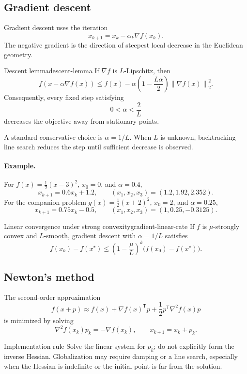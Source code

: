\documentclass[11pt]{article}
\newcommand{\trans}{^{\mathsf T}}
\newcommand{\grad}{\nabla}
\newcommand{\norm}[1]{\left\lVert#1\right\rVert}
\theoremstyle{definition}
\theoremstyle{remark}
\begin{document}
\subsection{Gradient descent}

Gradient descent uses the iteration
\[
  \boxed{x_{k+1}=x_k-\alpha_k\grad f(x_k).}
\]
The negative gradient is the direction of steepest local decrease in the
Euclidean geometry.

\begin{keyproposition}{Descent lemma}{descent-lemma}
If $\grad f$ is $L$-Lipschitz, then
\[
  f(x-\alpha\grad f(x))
  \leq f(x)-\alpha\left(1-\frac{L\alpha}{2}\right)
  \norm{\grad f(x)}_2^2.
\]
Consequently, every fixed step satisfying
\[
  \boxed{0<\alpha<\frac{2}{L}}
\]
decreases the objective away from stationary points.
\end{keyproposition}

A standard conservative choice is $\alpha=1/L$. When $L$ is unknown,
backtracking line search reduces the step until sufficient decrease is observed.

\paragraph{Example.}
For $f(x)=\frac12(x-3)^2$, $x_0=0$, and $\alpha=0.4$,
\[
x_{k+1}=0.6x_k+1.2,
\qquad (x_1,x_2,x_3)=(1.2,1.92,2.352).
\]
For the companion problem $g(x)=\frac12(x+2)^2$, $x_0=2$, and
$\alpha=0.25$,
\[
x_{k+1}=0.75x_k-0.5,
\qquad
\boxed{(x_1,x_2,x_3)=(1,0.25,-0.3125).}
\]

\begin{keyproposition}{Linear convergence under strong convexity}{gradient-linear-rate}
If $f$ is $\mu$-strongly convex and $L$-smooth, gradient descent with
$\alpha=1/L$ satisfies
\[
  \boxed{
  f(x_k)-f(x^\star)
  \leq
  \left(1-\frac{\mu}{L}\right)^k
  \bigl(f(x_0)-f(x^\star)\bigr).}
\]
\end{keyproposition}

\subsection{Newton's method}

The second-order approximation
\[
  f(x+p)\approx f(x)+\grad f(x)\trans p
  +\frac12p\trans\grad^2f(x)p
\]
is minimized by solving
\[
  \grad^2f(x_k)p_k=-\grad f(x_k),
  \qquad x_{k+1}=x_k+p_k.
\]

\begin{warningbox}{Implementation rule}
Solve the linear system for $p_k$; do not explicitly form the inverse Hessian.
Globalization may require damping or a line search, especially when the
Hessian is indefinite or the initial point is far from the solution.
\end{warningbox}
\end{document}
